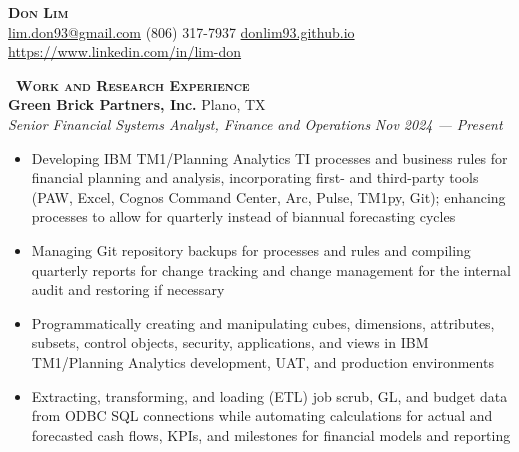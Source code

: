 \documentclass[a4paper,11pt]{article}
\newcommand{\header} [1] {
    \vspace{0.5mm}
    {\textsc{\textbf{\large{\xrfill[0.5ex]{0.5pt}~#1~\xrfill[0.5ex]{0.5pt}}}}} %
}
\begin{document}
\vspace*{-0.45in}
\fontsize{10.5}{11.5}\selectfont

\begin{center}
    {\Huge\textbf\textsc{{{Don Lim}}}}\\ \vspace{0.5mm}
    \href{mailto:lim.don93@gmail.com}{lim.don93@gmail.com}  (806) 317-7937  \href{https://donlim93.github.io/}{donlim93.github.io}  \href{https://www.linkedin.com/in/lim-don/}{https://www.linkedin.com/in/lim-don} \\
\end{center}
\vspace*{-2mm}

\header{Work and Research Experience} \\
\vspace{0.5mm}
\textbf{Green Brick Partners, Inc.} \hfill Plano, TX \\
\textit{Senior Financial Systems Analyst, Finance and Operations} \hfill \textit{Nov 2024 --- Present} \\
\begin{itemize}
    \item Developing IBM TM1/Planning Analytics TI processes and business rules for financial planning and analysis, incorporating first- and third-party tools (PAW, Excel, Cognos Command Center, Arc, Pulse, TM1py, Git); enhancing processes to allow for quarterly instead of biannual forecasting cycles
    \item Managing Git repository backups for processes and rules and compiling quarterly reports for change tracking and change management for the internal audit and restoring if necessary
    \item Programmatically creating and manipulating cubes, dimensions, attributes, subsets, control objects, security, applications, and views in IBM TM1/Planning Analytics development, UAT, and production environments
    \item Extracting, transforming, and loading (ETL) job scrub, GL, and budget data from ODBC SQL connections while automating calculations for actual and forecasted cash flows, KPIs, and milestones for financial models and reporting 
\end{itemize}
\vspace{0.5mm}
\end{document}
